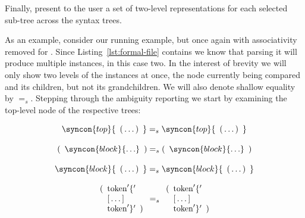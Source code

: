 \documentclass{kththesis}
\begin{document}
Finally, present to the user a set of two-level representations for each selected sub-tree across the syntax trees.




As an example, consider our running example, but once again with associativity removed for . Since Listing~\ref{lst:formal-file} contains  we know that parsing it will produce multiple instances, in this case two. In the interest of brevity we will only show two levels of the instances at once, the node currently being compared and its children, but not its grandchildren. We will also denote shallow equality by $=_s$. Stepping through the ambiguity reporting we start by examining the top-level node of the respective trees:

$$
\syncon{top}\{\enspace \text{(} \ldots \text{)} \enspace \}
=_s
\syncon{top}\{\enspace \text{(} \ldots \text{)} \enspace \}
$$

$$
\text{(} \enspace \syncon{block}\{\ldots\} \enspace \text{)}
=_s
\text{(} \enspace \syncon{block}\{\ldots\} \enspace \text{)}
$$

$$
\syncon{block}\{ \enspace \text{(} \ldots \text{)} \enspace \}
=_s
\syncon{block}\{ \enspace \text{(} \ldots \text{)} \enspace \}
$$

$$
\begin{array}{l}
\text{(} \enspace \text{token}'\{' \\
\hphantom{\text{(}} \enspace \text{[} \ldots \text{]} \\
\hphantom{\text{(}} \enspace \text{token}'\}' \enspace \text{)} \\
\end{array}
=_s
\begin{array}{l}
\text{(} \enspace \text{token}'\{' \\
\hphantom{\text{(}} \enspace \text{[} \ldots \text{]} \\
\hphantom{\text{(}} \enspace \text{token}'\}' \enspace \text{)} \\
\end{array}
$$
\end{document}
